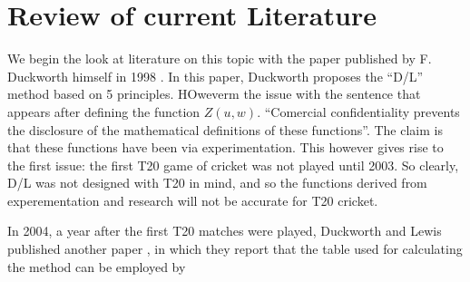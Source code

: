 \section{Review of current Literature}
We begin the look at literature on this topic with the paper published by F. Duckworth himself in 1998 \cite{duckworth}. In this paper, 
Duckworth proposes the ``D/L'' method based on 5 principles. HOweverm the issue with the sentence that appears after defining the function $Z(u,w)$.
``Comercial confidentiality prevents the disclosure of the mathematical definitions of these functions''. The claim is that these functions have been 
via experimentation. This however gives rise to the first issue: the first T20 game of cricket was not played until 2003. So clearly, D/L was not
designed with T20 in mind, and so the functions derived from experementation and research will not be accurate for T20 cricket. 

In 2004, a year after the first T20 matches were played, Duckworth and Lewis published another paper \cite{duckworth2}, in which they report
that the table used for calculating the method can be employed by 
